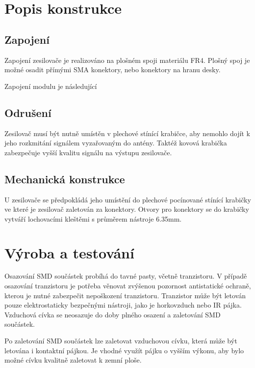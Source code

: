 \documentclass[12pt,a4paper,oneside]{article}
\begin{document}
\section{Popis konstrukce}

\subsection{Zapojení}

Zapojení zesilovače je realizováno na plošném spoji materiálu FR4. Plošný spoj je možné osadit přímými SMA konektory, nebo konektory na hranu desky. 

Zapojení modulu je následující

\subsection{Odrušení}

Zesilovač musí být nutně umístěn v plechové stínící krabičce, aby nemohlo dojít k jeho rozkmitání signálem vyzařovaným do antény. Taktéž kovová krabička zabezpečuje vyšší kvalitu signálu na výstupu zesilovače. 

\subsection{Mechanická konstrukce}

U zesilovače se předpokládá jeho umístění do plechové pocínované stínící krabičky ve které je zesilovač zaletován za konektory. 
Otvory pro konektory se do krabičky vytváří lochovacími kleštěmi s průměrem nástroje 6.35mm. 

\section{Výroba a testování}

Osazování SMD součástek probíhá do tavné pasty, včetně tranzistoru. V případě osazování tranzistoru je potřeba věnovat zvýšenou pozornost antistatické ochraně, kterou je nutné zabezpečit nepoškození tranzistoru. Tranzistor může být letován pouze elektrostaticky bezpečnými nástroji, jako je horkovzduch nebo IR pájka. 
Vzduchová cívka se neosazuje do doby plného osazení a zaletování SMD součástek. 

Po zaletování SMD součástek lze zaletovat vzduchovou cívku, která může být letována i kontaktní pájkou. Je vhodné využít pájku o vyšším výkonu, aby bylo možné cívku kvalitně zaletovat k zemní ploše. 
\end{document}
